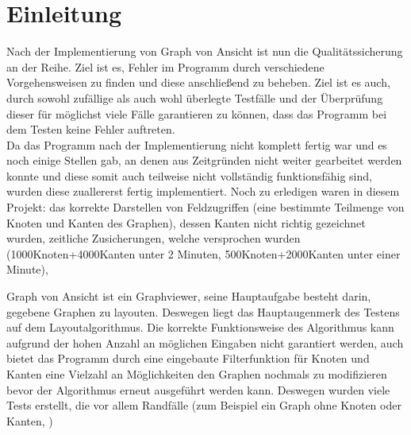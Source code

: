 \chapter{Einleitung}
\label{ch:einleitung}

Nach der Implementierung von Graph von Ansicht ist nun die Qualitätssicherung an der Reihe. Ziel ist es, Fehler im Programm durch verschiedene Vorgehensweisen zu finden und diese anschließend zu beheben. Ziel ist es auch, durch sowohl zufällige als auch wohl überlegte Testfälle und der Überprüfung dieser für möglichst viele Fälle garantieren zu können, dass das Programm bei dem Testen keine Fehler auftreten.\\%
Da das Programm nach der Implementierung nicht komplett fertig war und es noch einige Stellen gab, an denen aus Zeitgründen nicht weiter gearbeitet werden konnte und diese somit auch teilweise nicht vollständig funktionsfähig sind, wurden diese zuallererst fertig implementiert. Noch zu erledigen waren in diesem Projekt: das korrekte Darstellen von Feldzugriffen (eine bestimmte Teilmenge von Knoten und Kanten des Graphen), dessen Kanten nicht richtig gezeichnet wurden, zeitliche Zusicherungen, welche versprochen wurden (1000Knoten+4000Kanten unter 2 Minuten, 500Knoten+2000Kanten unter einer Minute), 

Graph von Ansicht ist ein Graphviewer, seine Hauptaufgabe besteht darin, gegebene Graphen zu layouten. Deswegen liegt das Hauptaugenmerk des Testens auf dem Layoutalgorithmus. Die korrekte Funktionsweise des Algorithmus kann aufgrund der hohen Anzahl an möglichen Eingaben nicht garantiert werden, auch bietet das Programm durch eine eingebaute Filterfunktion für Knoten und Kanten eine Vielzahl an Möglichkeiten den Graphen nochmals zu modifizieren bevor der Algorithmus erneut ausgeführt werden kann. Deswegen wurden viele Tests erstellt, die vor allem Randfälle (zum Beispiel ein Graph ohne Knoten oder Kanten, )



